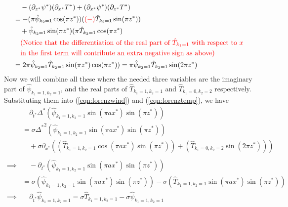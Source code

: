 \begin{align*}
&\quad -(\partial_{z^*} \psi^*)(\partial_{x^*} T^*) + (\partial_{x^*} \psi^*)(\partial_{z^*} T^*) \\
&= -(\pi\hat{\psi}_{k_2 = 1}\cos(\pi z^*)) (\mathcolor{red}{(-)}\hat{T}_{k_2 = 1} \sin(\pi z^*)) \\
&\quad + \hat{\psi}_{k_2 = 1}\sin(\pi z^*) (\pi\hat{T}_{k_2 = 1} \cos(\pi z^*) \\
&\quad
\begin{aligned}
&\textcolor{red}{\text{(Notice that the differentiation of the real part of $\hat{T}_{k_1 = 1}$ with respect to $x$}} \\
&\textcolor{red}{\text{in the first term will contribute an extra negative sign as above)}}
\end{aligned} \\
&= 2\pi\hat{\psi}_{k_2 = 1}\hat{T}_{k_2 = 1} \sin(\pi z^*)\cos(\pi z^*)) = \pi\hat{\psi}_{k_2 = 1}\hat{T}_{k_2 = 1} \sin(2\pi z^*)
\end{align*}
Now we will combine all these where the needed three variables are the imaginary part of $\hat{\psi}_{k_1 = 1, k_2 = 1}$, and the real parts of $\hat{T}_{k_1 = 1, k_2 = 1}$ and $\hat{T}_{k_1 = 0, k_2 = 2}$ respectively. Substituting them into (\ref{eqn:lorenzwind}) and (\ref{eqn:lorenztemp}), we have
\begin{align}
&\quad \partial_{t^*} \Delta^* (\hat{\psi}_{k_1 = 1, k_2 = 1}\sin(\pi a x^*)\sin(\pi z^*)) \nonumber \\
&= \sigma {\Delta^*}^2 (\hat{\psi}_{k_1 = 1, k_2 = 1}\sin(\pi a x^*)\sin(\pi z^*))\nonumber  \\
&\quad + \sigma \partial_{x^*} ((\hat{T}_{k_1 = 1, k_2 = 1}\cos(\pi a x^*)\sin(\pi z^*)) + (\hat{T}_{k_1 = 0, k_2 = 2}\sin(2\pi z^*))) \nonumber \\
\nonumber \\
\implies &\quad -\partial_{t^*}(\hat{\psi}_{k_1 = 1, k_2 = 1}\sin(\pi a x^*)\sin(\pi z^*)) \nonumber \\
&= \sigma (\hat{\psi}_{k_1 = 1, k_2 = 1}\sin(\pi a x^*)\sin(\pi z^*)) - \sigma (\hat{T}_{k_1 = 1, k_2 = 1}\sin(\pi a x^*)\sin(\pi z^*)) \nonumber \\
\implies &\quad \partial_{t^*}\hat{\psi}_{k_1 = 1, k_2 = 1} = \sigma\hat{T}_{k_1 = 1, k_2 = 1} - \sigma\hat{\psi}_{k_1 = 1, k_2 = 1} 
\end{align}
